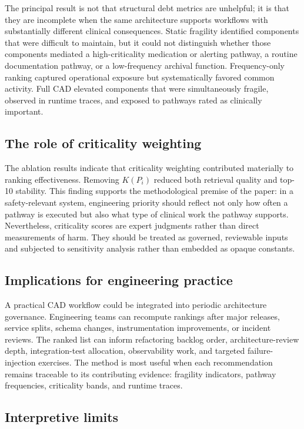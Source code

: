 \documentclass[english,preprint]{elsarticle}
\newcommand{\CAD}{\textsc{CAD}\xspace}
\begin{document}
The principal result is not that structural debt metrics are unhelpful; it is that they are incomplete when the same architecture supports workflows with substantially different clinical consequences. Static fragility identified components that were difficult to maintain, but it could not distinguish whether those components mediated a high-criticality medication or alerting pathway, a routine documentation pathway, or a low-frequency archival function. Frequency-only ranking captured operational exposure but systematically favored common activity. Full \CAD elevated components that were simultaneously fragile, observed in runtime traces, and exposed to pathways rated as clinically important.

\subsection{The role of criticality weighting}

The ablation results indicate that criticality weighting contributed materially to ranking effectiveness. Removing $K(P_i)$ reduced both retrieval quality and top-10 stability. This finding supports the methodological premise of the paper: in a safety-relevant system, engineering priority should reflect not only how often a pathway is executed but also what type of clinical work the pathway supports. Nevertheless, criticality scores are expert judgments rather than direct measurements of harm. They should be treated as governed, reviewable inputs and subjected to sensitivity analysis rather than embedded as opaque constants.

\subsection{Implications for engineering practice}

A practical \CAD workflow could be integrated into periodic architecture governance. Engineering teams can recompute rankings after major releases, service splits, schema changes, instrumentation improvements, or incident reviews. The ranked list can inform refactoring backlog order, architecture-review depth, integration-test allocation, observability work, and targeted failure-injection exercises. The method is most useful when each recommendation remains traceable to its contributing evidence: fragility indicators, pathway frequencies, criticality bands, and runtime traces.

\subsection{Interpretive limits}
\end{document}

